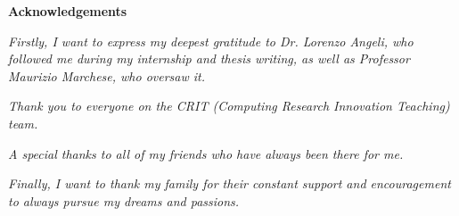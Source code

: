 \thispagestyle{empty}


\begin{center}
  {\bf \Huge Acknowledgements}
\end{center}

\vspace{4cm}
\emph{Firstly, I want to express my deepest gratitude to Dr. Lorenzo Angeli, who
followed me during my internship and thesis writing, as well as Professor Maurizio
Marchese, who oversaw it.}

\vspace{0.5cm}
\emph{Thank you to everyone on the CRIT (Computing Research Innovation Teaching)
team.}

\vspace{0.5cm}
\emph{A special thanks to all of my friends who have always been there for me.}

\vspace{0.5cm}
\emph{Finally, I want to thank my family for their constant support and
encouragement to always pursue my dreams and passions.}